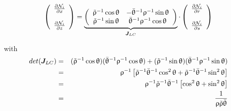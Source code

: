 \begin{mdframed}[backgroundcolor=blue!5]
\begin{equation}
\left(
\begin{array}{c}
\frac{\partial {\mathcal{N}}_i}{\partial x} \\ \\
\frac{\partial {\mathcal{N}}_i}{\partial z} 
\end{array}
\right)
=
\underbrace{
\left(
\begin{array}{cc}
\tilde{\uprho}^{-1}\cos\uptheta & -\bar{\uptheta}^{-1}\uprho^{-1}\sin\uptheta \\
\tilde{\uprho}^{-1}\sin\uptheta &  \bar{\uptheta}^{-1}\uprho^{-1}\cos\uptheta
\end{array}
\right)
}_{{\bm J}_{LC}}
\cdot 
\left(
\begin{array}{c}
\frac{\partial {\mathcal{N}}_i}{\partial r} \\ \\
\frac{\partial {\mathcal{N}}_i}{\partial s} 
\end{array}
\right)  
\end{equation}
\end{mdframed}
with
\begin{eqnarray}
det({\bm J}_{LC})
&=&
(\tilde{\uprho}^{-1}\cos\uptheta)
(\bar{\uptheta}^{-1}\uprho^{-1}\cos\uptheta)
+ 
(\tilde{\uprho}^{-1}\sin\uptheta) 
(\bar{\uptheta}^{-1}\uprho^{-1}\sin\uptheta)  \nonumber\\
&=&
\uprho^{-1}
\left[
\tilde{\uprho}^{-1}
\bar{\uptheta}^{-1}\cos^2\uptheta
+ 
\tilde{\uprho}^{-1}
\bar{\uptheta}^{-1}\sin^2\uptheta  \right] \nonumber\\
&=&
\uprho^{-1} \tilde{\uprho}^{-1} \bar{\uptheta}^{-1}
\left[
\cos^2\uptheta
+ 
\sin^2\uptheta  \right] \nonumber\\
&=&
\frac{1}{\uprho \tilde{\uprho}  \bar{\uptheta}}
\end{eqnarray}

